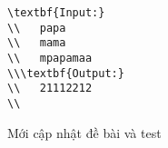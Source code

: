 \begin{verbatim}
\textbf{Input:}
\\   papa
\\   mama
\\   mpapamaa
\\\textbf{Output:}
\\   21112212
\\\end{verbatim}
	\item    Mới cập nhật đề bài và test